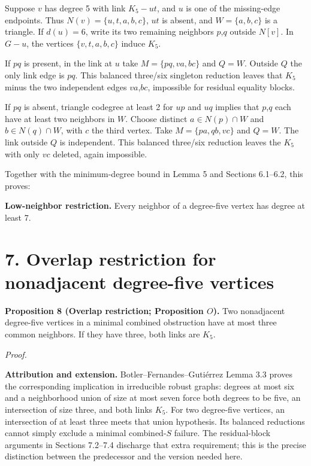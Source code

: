 \documentclass[11pt]{article}
\begin{document}
Suppose \(v\) has degree 5 with link \(K_5-ut\), and \(u\) is one of the
missing-edge endpoints. Thus \(N(v)=\{u,t,a,b,c\}\), \(ut\) is absent,
and \(W=\{a,b,c\}\) is a triangle. If \(d(u)=6\), write its two
remaining neighbors \(p\),\(q\) outside \(N[v]\). In \(G-u\), the
vertices \(\{v,t,a,b,c\}\) induce \(K_5\).

If \(pq\) is present, in the link at \(u\) take \(M=\{pq,va,bc\}\) and
\(Q=W\). Outside \(Q\) the only link edge is \(pq\). This balanced
three/six singleton reduction leaves that \(K_5\) minus the two
independent edges \(va\),\(bc\), impossible for residual equality
blocks.

If \(pq\) is absent, triangle codegree at least 2 for \(up\) and \(uq\)
implies that \(p\),\(q\) each have at least two neighbors in \(W\).
Choose distinct \(a\in N(p)\cap W\) and \(b\in N(q)\cap W\), with \(c\)
the third vertex. Take \(M=\{pa,qb,vc\}\) and \(Q=W\). The link outside
\(Q\) is independent. This balanced three/six reduction leaves the
\(K_5\) with only \(vc\) deleted, again impossible.

Together with the minimum-degree bound in Lemma 5 and Sections 6.1--6.2,
this proves:

\textbf{Low-neighbor restriction.} Every neighbor of a degree-five
vertex has degree at least 7.

\section{7. Overlap restriction for nonadjacent degree-five
vertices}\label{overlap-restriction-for-nonadjacent-degree-five-vertices}

\textbf{Proposition 8 (Overlap restriction; Proposition \(O\)).} Two
nonadjacent degree-five vertices in a minimal combined obstruction have
at most three common neighbors. If they have three, both links are
\(K_5\).

\emph{Proof.}

\textbf{Attribution and extension.} Botler--Fernandes--Gutiérrez Lemma
3.3 proves the corresponding implication in irreducible robust graphs:
degrees at most six and a neighborhood union of size at most seven force
both degrees to be five, an intersection of size three, and both links
\(K_5\). For two degree-five vertices, an intersection of at least three
meets that union hypothesis. Its balanced reductions cannot simply
exclude a minimal combined-\(S\) failure. The residual-block arguments
in Sections 7.2--7.4 discharge that extra requirement; this is the
precise distinction between the predecessor and the version needed here.
\end{document}
